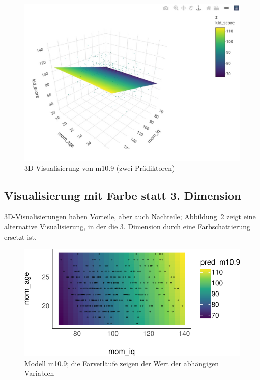 \documentclass[
  a4paper,
  DIV=11]{scrreprt}
\theoremstyle{definition}
\theoremstyle{remark}
\begin{document}
\begin{figure}

{\centering \includegraphics[width=1\textwidth,height=\textheight]{./img/m109-plotly.jpg}

}

\caption{\label{fig-m109-plotly}3D-Visualisierung von m10.9 (zwei
Prädiktoren)}

\end{figure}

\hypertarget{visualisierung-mit-farbe-statt-3.-dimension}{%
\subsection{Visualisierung mit Farbe statt 3.
Dimension}\label{visualisierung-mit-farbe-statt-3.-dimension}}

3D-Visualisierungen haben Vorteile, aber auch Nachteile;
Abbildung~\ref{fig-m109-color} zeigt eine alternative Visualisierung, in
der die 3. Dimension durch eine Farbschattierung ersetzt ist.

\begin{figure}

{\centering \includegraphics{./metrische-AV_files/figure-pdf/fig-m109-color-1.pdf}

}

\caption{\label{fig-m109-color}Modell m10.9; die Farverläufe zeigen der
Wert der abhängigen Variablen}

\end{figure}
\end{document}
